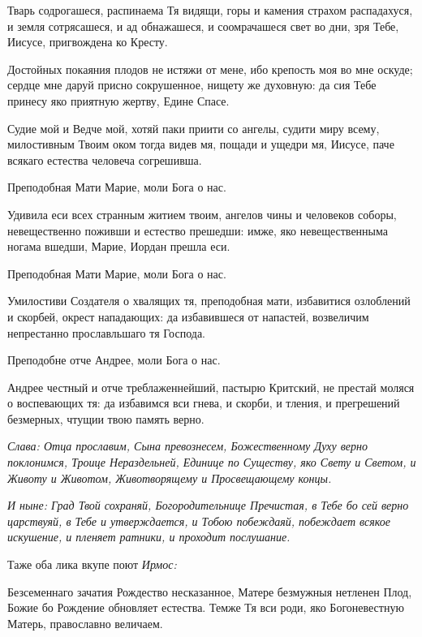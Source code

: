 Тварь содрогашеся, распинаема Тя видящи, горы и камения страхом распадахуся, и земля сотрясашеся, и ад обнажашеся, и соомрачашеся свет во дни, зря Тебе, Иисусе, пригвождена ко Кресту. 

Достойных покаяния плодов не истяжи от мене, ибо крепость моя во мне оскуде; сердце мне даруй присно сокрушенное, нищету же духовную: да сия Тебе принесу яко приятную жертву, Едине Спасе. 

Судие мой и Ведче мой, хотяй паки приити со ангелы, судити миру всему, милостивным Твоим оком тогда видев мя, пощади и ущедри мя, Иисусе, паче всякаго естества человеча согрешивша. 

\bfseries 

Преподобная Мати Марие, моли Бога о нас.

\normalfont{}

Удивила еси всех странным житием твоим, ангелов чины и человеков соборы, невещественно поживши и естество прешедши: имже, яко невещественныма ногама вшедши, Марие, Иордан прешла еси. 

\bfseries 

Преподобная Мати Марие, моли Бога о нас.

\normalfont{}

Умилостиви Создателя о хвалящих тя, преподобная мати, избавитися озлоблений и скорбей, окрест нападающих: да избавившеся от напастей, возвеличим непрестанно прославльшаго тя Господа. 

\bfseries 

Преподобне отче Андрее, моли Бога о нас.

\normalfont{}

Андрее честный и отче треблаженнейший, пастырю Критский, не престай моляся о воспевающих тя: да избавимся вси гнева, и скорби, и тления, и прегрешений безмерных, чтущии твою память верно. 

\itshape Слава\normalfont{}: Отца прославим, Сына превознесем, Божественному Духу верно поклонимся, Троице Нераздельней, Единице по Существу, яко Свету и Светом, и Животу и Животом, Животворящему и Просвещающему концы. 

\itshape И ныне\normalfont{}: Град Твой сохраняй, Богородительнице Пречистая, в Тебе бо сей верно царствуяй, в Тебе и утверждается, и Тобою побеждаяй, побеждает всякое искушение, и пленяет ратники, и проходит послушание. 

Таже оба лика вкупе поют \itshape Ирмос\normalfont{}: 

Безсеменнаго зачатия Рождество несказанное, Матере безмужныя нетленен Плод, Божие бо Рождение обновляет естества. Темже Тя вси роди, яко Богоневестную Матерь, православно величаем.






